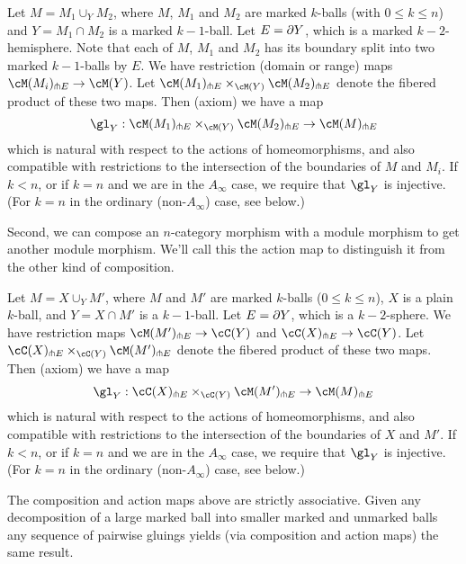 \begin{module-axiom}
{Let $M = M_1 \cup_Y M_2$, where $M$, $M_1$ and $M_2$ are marked $k$-balls (with $0\le k\le n$)
and $Y = M_1\cap M_2$ is a marked $k{-}1$-ball.
Let $E = \partial Y$, which is a marked $k{-}2$-hemisphere.
Note that each of $M$, $M_1$ and $M_2$ has its boundary split into two marked $k{-}1$-balls by $E$.
We have restriction (domain or range) maps $\cM(M_i)\trans E \to \cM(Y)$.
Let $\cM(M_1) \trans E \times_{\cM(Y)} \cM(M_2) \trans E$ denote the fibered product of these two maps. 
Then (axiom) we have a map
\[
	\gl_Y : \cM(M_1) \trans E \times_{\cM(Y)} \cM(M_2) \trans E \to \cM(M) \trans E
\]
which is natural with respect to the actions of homeomorphisms, and also compatible with restrictions
to the intersection of the boundaries of $M$ and $M_i$.
If $k < n$,
or if $k=n$ and we are in the $A_\infty$ case, 
we require that $\gl_Y$ is injective.
(For $k=n$ in the ordinary (non-$A_\infty$) case, see below.)}
\end{module-axiom}


Second, we can compose an $n$-category morphism with a module morphism to get another
module morphism.
We'll call this the action map to distinguish it from the other kind of composition.

\begin{module-axiom}
{Let $M = X \cup_Y M'$, where $M$ and $M'$ are marked $k$-balls ($0\le k\le n$),
$X$ is a plain $k$-ball,
and $Y = X\cap M'$ is a $k{-}1$-ball.
Let $E = \partial Y$, which is a $k{-}2$-sphere.
We have restriction maps $\cM(M') \trans E \to \cC(Y)$ and $\cC(X) \trans E\to \cC(Y)$.
Let $\cC(X)\trans E \times_{\cC(Y)} \cM(M') \trans E$ denote the fibered product of these two maps. 
Then (axiom) we have a map
\[
	\gl_Y :\cC(X)\trans E \times_{\cC(Y)} \cM(M')\trans E \to \cM(M) \trans E
\]
which is natural with respect to the actions of homeomorphisms, and also compatible with restrictions
to the intersection of the boundaries of $X$ and $M'$.
If $k < n$,
or if $k=n$ and we are in the $A_\infty$ case, 
we require that $\gl_Y$ is injective.
(For $k=n$ in the ordinary (non-$A_\infty$) case, see below.)}
\end{module-axiom}

\begin{module-axiom}
The composition and action maps above are strictly associative.
Given any decomposition of a large marked ball into smaller marked and unmarked balls
any sequence of pairwise gluings yields (via composition and action maps) the same result.
\end{module-axiom}

